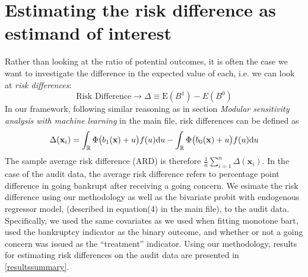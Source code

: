 \documentclass[aoas,preprint, 11pt, dvipsnames, table, x11name]{imsart}
\newcommand{\E}{\mbox{E}}
\theoremstyle{remark}
\begin{document}
	\section{Estimating the risk difference as estimand of interest}\label{4.4}
	Rather than looking at the ratio of potential outcomes, it is often the case we want to investigate the difference in the expected value of each, i.e. we can look at \emph{risk differences}:
	\[\text{Risk Difference}\rightarrow \Delta \equiv \E(B^1)-E(B^0)\]
	In our framework, following similar reasoning as in section \emph{Modular sensitivity analysis with machine learning} in the main file,  risk differences can be defined as 
	\[\Delta(\mathbf{x}_i)=\int_{\mathbb{R}} \Phi\qty(b_1(\mathbf{x})+u)f(u)\dd u - \int_{\mathbb{R}} \Phi\qty(b_0(\mathbf{x})+u) f(u)\dd u\]
	The sample average risk difference (ARD) is therefore $\frac{1}{n}\sum_{i=1}^{n}\Delta(\mathbf{x}_i)$. In the case of the audit data, the average risk difference refers to percentage point difference in going bankrupt after receiving a going concern. We esimate the risk difference using our methodology as well as the bivariate probit with endogenous regressor model, (described in equation(4) in the main file), to the audit data.  Specifically, we used the same covariates as we used when fitting monotone bart, used the bankruptcy indicator as the binary outcome, and whether or not a going concern was issued as the ``treatment'' indicator.  Using our methodology, results for estimating risk differences on the audit data are presented in  \autoref{resultssummary}.
	
\end{document}
